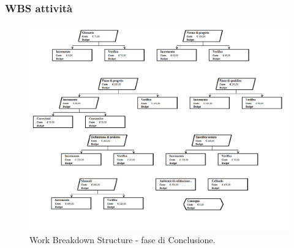 \documentclass[a4paper]{article}
\begin{document}
			\subsubsection{WBS attività}
				\begin{figure}[H]
					\centering
					\includegraphics[scale=0.5]{wbs_conclusione}
					\caption{Work Breakdown Structure - fase di Conclusione.}
				\end{figure}
\end{document}
